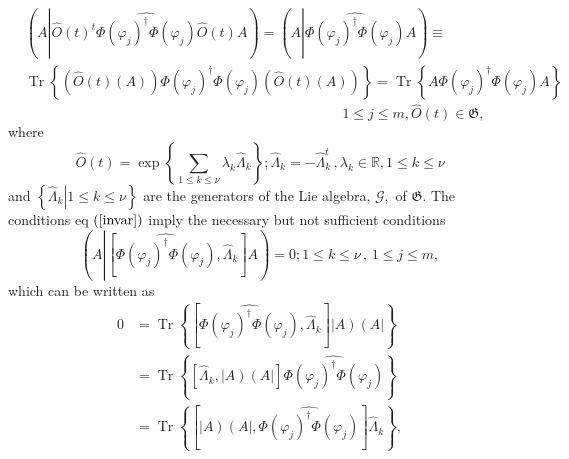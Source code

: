 \documentclass[aps,preprint]{revtex4}%
\begin{document}
%

\begin{align}
&  \left(  A\left\vert \widehat{O}\left(  t\right)  ^{t}\widehat{\Phi\left(
\varphi_{j}\right)  ^{\dagger}\Phi\left(  \varphi_{j}\right)  }\widehat
{O}\left(  t\right)  A\right.  \right)  =\left(  A\left\vert \widehat
{\Phi\left(  \varphi_{j}\right)  ^{\dagger}\Phi\left(  \varphi_{j}\right)
}A\right.  \right)  \equiv\label{invar}\\
&  \operatorname{Tr}\left\{  \left(  \widehat{O}\left(  t\right)  \left(
A\right)  \right)  \Phi\left(  \varphi_{j}\right)  ^{\dagger}\Phi\left(
\varphi_{j}\right)  \left(  \widehat{O}\left(  t\right)  \left(  A\right)
\right)  \right\}  =\operatorname{Tr}\left\{  A\Phi\left(  \varphi_{j}\right)
^{\dagger}\Phi\left(  \varphi_{j}\right)  A\right\}
\end{align}%
\begin{equation}
\qquad\qquad\qquad\qquad\qquad\qquad\qquad\qquad\qquad\qquad\qquad1\leq j\leq
m,\widehat{O}\left(  t\right)  \in\mathfrak{G,}%
\end{equation}
where
\begin{equation}
\widehat{O}\left(  t\right)  =\exp\left\{  \sum_{1\leq k\leq\nu}\lambda
_{k}\widehat{\Lambda}_{k}\right\}  ;\widehat{\Lambda}_{k}=-\widehat{\Lambda
}_{k}^{t}\,,\lambda_{k}\in\mathbb{R},1\leq k\leq\nu
\end{equation}
and $\left\{  \left.  \widehat{\Lambda}_{k}\right\vert 1\leq k\leq\nu\right\}
$ are the generators of the Lie algebra, $\mathcal{G},$ of $\mathfrak{G}$. The
conditions eq $\left(  \ref{invar}\right)  $ imply the necessary but not
sufficient conditions
\begin{equation}
\left(  A\left\vert \left[  \widehat{\Phi\left(  \varphi_{j}\right)
^{\dagger}\Phi\left(  \varphi_{j}\right)  },\widehat{\Lambda}_{k}\right]
\right.  A\right)  =0;1\leq k\leq\nu\,\text{, }1\leq j\leq m,
\end{equation}
which can be written as
\begin{align}
0  &  =\operatorname{Tr}\left\{  \left[  \widehat{\Phi\left(  \varphi
_{j}\right)  ^{\dagger}\Phi\left(  \varphi_{j}\right)  },\widehat{\Lambda}%
_{k}\right]  \left\vert A\right)  \left(  A\right\vert \right\} \\
&  =\operatorname{Tr}\left\{  \left[  \widehat{\Lambda}_{k},\left\vert
A\right)  \left(  A\right\vert \right]  \widehat{\Phi\left(  \varphi
_{j}\right)  ^{\dagger}\Phi\left(  \varphi_{j}\right)  }\right\} \\
&  =\operatorname{Tr}\left\{  \left[  \left\vert A\right)  \left(
A\right\vert ,\widehat{\Phi\left(  \varphi_{j}\right)  ^{\dagger}\Phi\left(
\varphi_{j}\right)  }\right]  \widehat{\Lambda}_{k}\right\}  ,
\end{align}
\end{document}
